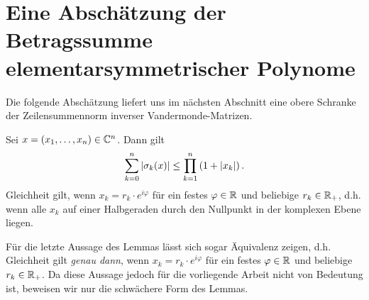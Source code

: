 \section{Eine Abschätzung der Betragssumme elementarsymmetrischer Polynome}

Die folgende Abschätzung liefert uns im nächsten Abschnitt eine obere Schranke
der Zeilensummennorm inverser Vandermonde-Matrizen.
\begin{lemma}
    \label{lemma:elementary_symmetric_polynomials_inequality}
    Sei $x = (x_1, \dots, x_n) \in \mathbb{C}^n$.
    Dann gilt
    \begin{equation}
        \label{eq:elementary_symmetric_polynomials_inequality}
        \sum_{k=0}^{n} \left\lvert \sigma_{k}(x) \right\rvert \leq \prod_{k=1}^{n} \left( 1 + \left\lvert x_k \right\rvert \right).
    \end{equation}
    Gleichheit gilt, wenn $x_k = r_k \cdot e^{i\varphi}$ für ein
    festes $\varphi \in \mathbb{R}$ und beliebige $r_k \in \mathbb{R}_+$,
    d.h. wenn alle $x_k$ auf einer Halbgeraden durch den Nullpunkt
    in der komplexen Ebene liegen.
\end{lemma}

\begin{remark}
    Für die letzte Aussage des Lemmas lässt sich sogar Äquivalenz zeigen, d.h.
    Gleichheit gilt \emph{genau dann}, wenn $x_k = r_k \cdot e^{i\varphi}$ für
    ein festes $\varphi \in \mathbb{R}$ und beliebige $r_k \in \mathbb{R}_+$.
    Da diese Aussage jedoch für die vorliegende Arbeit nicht von Bedeutung ist,
    beweisen wir nur die schwächere Form des Lemmas.
\end{remark}

